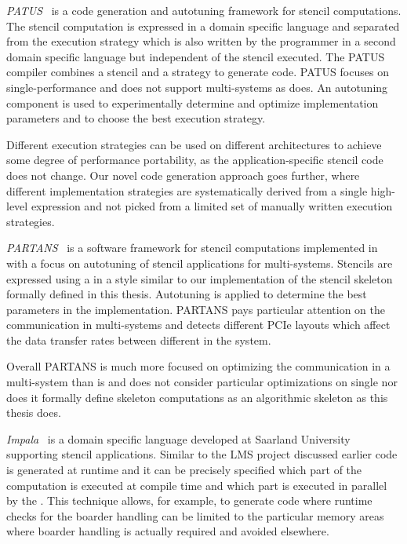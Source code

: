 \bigskip

\emph{{\small PATUS}}~\cite{ChristenSB11} is a code generation and autotuning framework for stencil computations.
The stencil computation is expressed in a domain specific language and separated from the execution strategy which is also written by the programmer in a second domain specific language but independent of the stencil executed.
The {\small PATUS} compiler combines a stencil and a strategy to generate \OpenCL code.
{\small PATUS} focuses on single-\GPU performance and does not support multi-\GPU systems as \SkelCL does.
An autotuning component is used to experimentally determine and optimize implementation parameters and to choose the best execution strategy.

Different execution strategies can be used on different architectures to achieve some degree of performance portability, as the application-specific stencil code does not change.
Our novel code generation approach goes further, where different implementation strategies are systematically derived from a single high-level expression and not picked from a limited set of manually written execution strategies.

\bigskip

\emph{{\small PARTANS}}~\cite{LutzFC13} is a software framework for stencil computations implemented in \Cpp with a focus on autotuning of stencil applications for multi-\GPU systems.
Stencils are expressed using a \Cpp \API in a style similar to our \SkelCL \Cpp implementation of the stencil skeleton formally defined in this thesis.
Autotuning is applied to determine the best parameters in the implementation.
{\small PARTANS} pays particular attention on the communication in multi-\GPU systems and detects different PCIe layouts which affect the data transfer rates between different \GPUs in the system.

Overall {\small PARTANS} is much more focused on optimizing the communication in a multi-\GPU system than \SkelCL is and does not consider particular optimizations on single \GPUs nor does it formally define skeleton computations as an algorithmic skeleton as this thesis does.

\bigskip
\emph{Impala}~\cite{KosterLHMS14} is a domain specific language developed at Saarland University supporting stencil applications.
Similar to the {\small LMS} project discussed earlier code is generated at runtime and it can be precisely specified which part of the computation is executed at compile time and which part is executed in parallel by the \GPU.
This technique allows, for example, to generate \GPU code where runtime checks for the boarder handling can be limited to the particular memory areas where boarder handling is actually required and avoided elsewhere.

